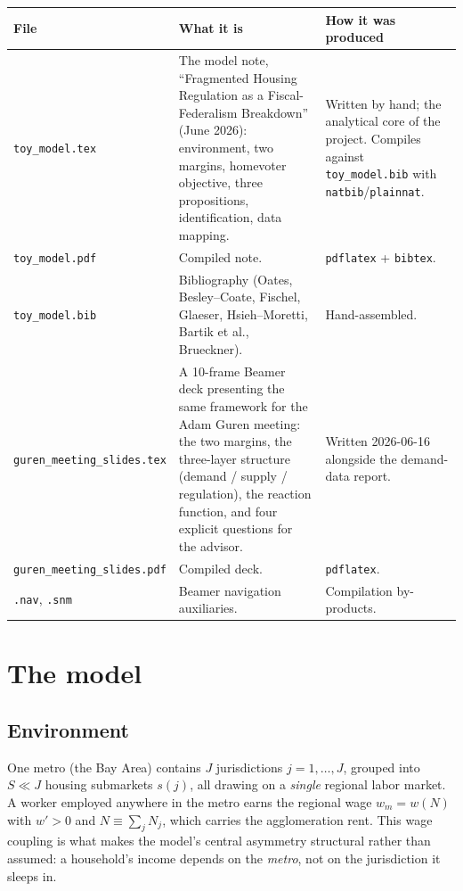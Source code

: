 \documentclass[11pt]{article}
\begin{document}
\begin{table}[h]
\centering
\begin{tabular}{@{}p{}p{}p{}@{}}
\toprule
File & What it is & How it was produced \\
\midrule
\texttt{toy\_model.tex} &
The model note, ``Fragmented Housing Regulation as a Fiscal-Federalism Breakdown'' (June 2026):
environment, two margins, homevoter objective, three propositions, identification, data mapping. &
Written by hand; the analytical core of the project. Compiles against
\texttt{toy\_model.bib} with \texttt{natbib}/\texttt{plainnat}. \\
\addlinespace
\texttt{toy\_model.pdf} & Compiled note. & \texttt{pdflatex} + \texttt{bibtex}. \\
\addlinespace
\texttt{toy\_model.bib} & Bibliography (Oates, Besley--Coate, Fischel, Glaeser, Hsieh--Moretti,
Bartik et al., Brueckner). & Hand-assembled. \\
\addlinespace
\texttt{guren\_meeting\_slides.tex} &
A 10-frame Beamer deck presenting the same framework for the Adam Guren meeting: the two margins,
the three-layer structure (demand / supply / regulation), the reaction function, and four explicit
questions for the advisor. & Written 2026-06-16 alongside the demand-data report. \\
\addlinespace
\texttt{guren\_meeting\_slides.pdf} & Compiled deck. & \texttt{pdflatex}. \\
\addlinespace
\texttt{.nav}, \texttt{.snm} & Beamer navigation auxiliaries. & Compilation by-products. \\
\bottomrule
\end{tabular}
\end{table}

\section{The model}

\subsection{Environment}

One metro (the Bay Area) contains $J$ jurisdictions $j = 1,\dots,J$, grouped into $S \ll J$ housing
submarkets $s(j)$, all drawing on a \emph{single} regional labor market. A worker employed anywhere
in the metro earns the regional wage $w_m = w(N)$ with $w' > 0$ and $N \equiv \sum_j N_j$, which
carries the agglomeration rent. This wage coupling is what makes the model's central asymmetry
structural rather than assumed: a household's income depends on the \emph{metro}, not on the
jurisdiction it sleeps in.
\end{document}
